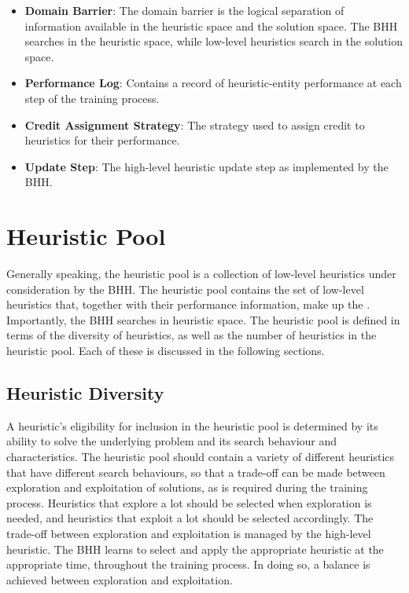 \begin{itemize}
      \item \textbf{Domain Barrier}: The domain barrier is the logical separation of information available in the heuristic space and the solution space. The \acs{BHH} searches in the heuristic space, while low-level heuristics search in the solution space.

      \item \textbf{Performance Log}: Contains a record of heuristic-entity performance at each step of the training process.

      \item \textbf{Credit Assignment Strategy}: The strategy used to assign credit to heuristics for their performance.

      \item \textbf{Update Step}: The high-level heuristic update step as implemented by the \acs{BHH}.
\end{itemize}

\section{Heuristic Pool}\label{sec:bhh:heuristic_pool}

Generally speaking, the heuristic pool is a collection of low-level heuristics under consideration by the \acs{BHH}. The heuristic pool contains the set of low-level heuristics that, together with their performance information, make up the . Importantly, the \acs{BHH} searches in heuristic space. The heuristic pool is defined in terms of the diversity of heuristics, as well as the number of heuristics in the heuristic pool. Each of these is discussed in the following sections.

\subsection{Heuristic Diversity}\label{sec:bhh:heuristic_pool:diversity}

A heuristic's eligibility for inclusion in the heuristic pool is determined by its ability to solve the underlying problem and its search behaviour and characteristics. The heuristic pool should contain a variety of different heuristics that have different search behaviours, so that a trade-off can be made between exploration and exploitation of solutions, as is required during the training process. Heuristics that explore a lot should be selected when exploration is needed, and heuristics that exploit a lot should be selected accordingly. The trade-off between exploration and exploitation is managed by the high-level heuristic. The \acs{BHH} learns to select and apply the appropriate heuristic at the appropriate time, throughout the training process. In doing so, a balance is achieved between exploration and exploitation.

